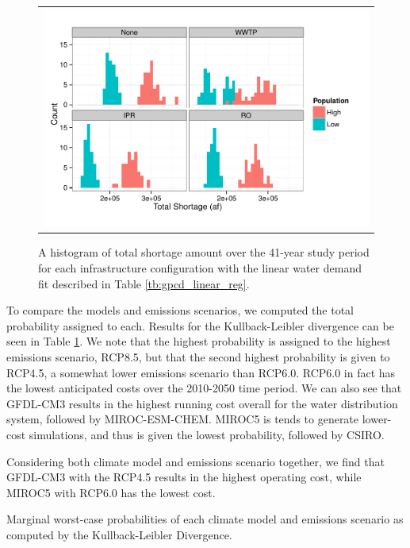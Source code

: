\documentclass[opre,nonblindrev]{informs3} %
\begin{document}
\begin{figure}
	\FIGURE
	{%
		\begin{tabular}{c}
			\includegraphics*[width=.9\textwidth]{images/linear_shortage_frequency}%
		\end{tabular}
	}
	{
		A histogram of total shortage amount over the 41-year study period for each infrastructure configuration with the linear water demand fit described in Table \ref{tb:gpcd_linear_reg}.
		\label{fig:shortage_frequency_linear}
	}
	{}
\end{figure}

To compare the models and emissions scenarios, we computed the total probability assigned to each.
Results for the Kullback-Leibler divergence can be seen in Table \ref{tb:pworst_model_emission_kl}.
We note that the highest probability is assigned to the highest emissions scenario, RCP8.5, but that the second highest probability is given to RCP4.5, a somewhat lower emissions scenario than RCP6.0.
RCP6.0 in fact has the lowest anticipated costs over the 2010-2050 time period.
We can also see that GFDL-CM3 results in the highest running cost overall for the water distribution system, followed by MIROC-ESM-CHEM.
MIROC5 is tends to generate lower-cost simulations, and thus is given the lowest probability, followed by CSIRO.

Considering both climate model and emissions scenario together, we find that GFDL-CM3 with the RCP4.5 results in the highest operating cost, while MIROC5 with RCP6.0 has the lowest cost.

\begin{table}
	\TABLE
	{
		Marginal worst-case probabilities of each climate model and emissions scenario as computed by the Kullback-Leibler Divergence.
		\label{tb:pworst_model_emission_kl}
	}
	{\begin{tabular}{l|cccc|c}
		
	 \end{tabular}}
	{}
\end{table}
\end{document}
